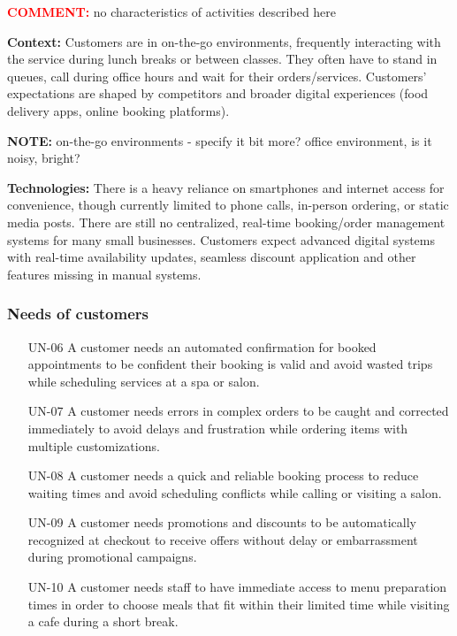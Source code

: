 \documentclass[]{VUMIFTemplateClass}
\newcommand{\yellowcomment}[1]{%
    \begin{tcolorbox}[colback=yellow!80, colframe=yellow!80, arc=0pt, outer arc=0pt, boxrule=0pt, left=3pt, right=3pt, top=3pt, bottom=3pt]
        \textbf{\textcolor{red}{COMMENT:}} #1
    \end{tcolorbox}
}
\newcommand{\noticecomment}[1]{%
    \begin{tcolorbox}[colback=blue!20, colframe=blue!60, arc=0pt, outer arc=0pt, boxrule=1pt, left=3pt, right=3pt, top=3pt, bottom=3pt]
        \textbf{\textcolor{blue!70!black}{NOTE:}} #1
    \end{tcolorbox}
}
\begin{document}
\yellowcomment{no characteristics of activities described here}

\textbf{Context:} Customers are in on-the-go environments, frequently
interacting with the service during lunch breaks or between classes. They often
have to stand in queues, call during office hours and wait for their
orders/services. Customers' expectations are shaped by competitors and broader
digital experiences (food delivery apps, online booking platforms).

\noticecomment{on-the-go environments - specify it bit more? office environment, is it noisy, bright?}

\textbf{Technologies:} There is a heavy reliance on smartphones and internet
access for convenience, though currently limited to phone calls, in-person
ordering, or static media posts. There are still no centralized, real-time
booking/order management systems for many small businesses. Customers expect
advanced digital systems with real-time availability updates, seamless discount
application and other features missing in manual systems.

\subsubsection{Needs of customers}
\begin{itemize}
    \item[UN-06] A customer needs an automated confirmation for booked appointments to be confident their booking is valid and avoid wasted trips while scheduling services at a spa or salon.
    \item[UN-07] A customer needs errors in complex orders to be caught and corrected immediately to avoid delays and frustration while ordering items with multiple customizations.
    \item[UN-08] A customer needs a quick and reliable booking process to reduce waiting times and avoid scheduling conflicts while calling or visiting a salon.
    \item[UN-09] A customer needs promotions and discounts to be automatically recognized at checkout to receive offers without delay or embarrassment during promotional campaigns.
    \item[UN-10]  A customer needs staff to have immediate access to menu preparation times in order to choose meals that fit within their limited time while visiting a cafe during a short break.
   
\end{itemize}
\end{document}
